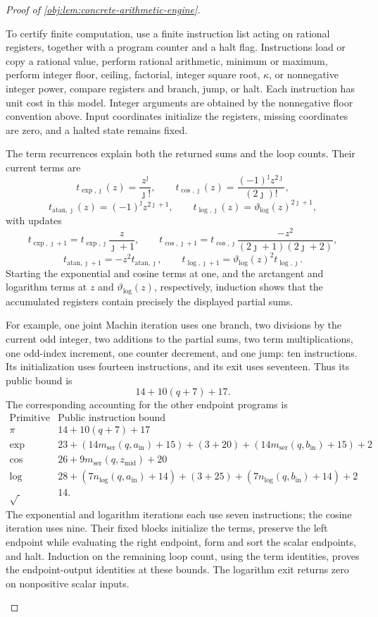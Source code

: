 \documentclass[11pt]{article}
\begin{document}
\begin{proof}[Proof of \cref{obj:lem:concrete-arithmetic-engine}]
\begin{enumerate}
To certify finite computation, use a finite instruction list acting on rational registers, together with a program counter and a halt flag. Instructions load or copy a rational value, perform rational arithmetic, minimum or maximum, perform integer floor, ceiling, factorial, integer square root, \(\kappa\), or nonnegative integer power, compare registers and branch, jump, or halt. Each instruction has unit cost in this model. Integer arguments are obtained by the nonnegative floor convention above. Input coordinates initialize the registers, missing coordinates are zero, and a halted state remains fixed.

The term recurrences explain both the returned sums and the loop counts. Their current terms are
\[
t_{\exp,\jmath}(z)=\frac{z^\jmath}{\jmath!},
\qquad
t_{\cos,\jmath}(z)=\frac{(-1)^\jmath z^{2\jmath}}{(2\jmath)!},
\]
\[
t_{\mathrm{atan},\jmath}(z)=(-1)^\jmath z^{2\jmath+1},
\qquad
t_{\log,\jmath}(z)=\vartheta_{\log}(z)^{2\jmath+1},
\]
with updates
\[
t_{\exp,\jmath+1}
 =t_{\exp,\jmath}\frac{z}{\jmath+1},
\qquad
t_{\cos,\jmath+1}
 =t_{\cos,\jmath}\frac{-z^2}{(2\jmath+1)(2\jmath+2)},
\]
\[
t_{\mathrm{atan},\jmath+1}
 =-z^2t_{\mathrm{atan},\jmath},
\qquad
t_{\log,\jmath+1}
 =\vartheta_{\log}(z)^2t_{\log,\jmath}.
\]
Starting the exponential and cosine terms at one, and the arctangent and logarithm terms at \(z\) and \(\vartheta_{\log}(z)\), respectively, induction shows that the accumulated registers contain precisely the displayed partial sums.

For example, one joint Machin iteration uses one branch, two divisions by the current odd integer, two additions to the partial sums, two term multiplications, one odd-index increment, one counter decrement, and one jump: ten instructions. Its initialization uses fourteen instructions, and its exit uses seventeen. Thus its public bound is
\[
14+10(q+7)+17.
\]
The corresponding accounting for the other endpoint programs is
\[
\begin{array}{c|l}
\text{Primitive}&\text{Public instruction bound}\\ \hline
\pi&14+10(q+7)+17\\
\exp&
23+(14m_{\mathrm{ser}}(q,a_{\mathrm{in}})+15)
 +(3+20)+(14m_{\mathrm{ser}}(q,b_{\mathrm{in}})+15)+2\\
\cos&26+9m_{\mathrm{ser}}(q,z_{\mathrm{mid}})+20\\
\log&
28+(7n_{\log}(q,a_{\mathrm{in}})+14)
 +(3+25)+(7n_{\log}(q,b_{\mathrm{in}})+14)+2\\
\sqrt{\ }&14 .
\end{array}
\]
The exponential and logarithm iterations each use seven instructions; the cosine iteration uses nine. Their fixed blocks initialize the terms, preserve the left endpoint while evaluating the right endpoint, form and sort the scalar endpoints, and halt. Induction on the remaining loop count, using the term identities, proves the endpoint-output identities at these bounds. The logarithm exit returns zero on nonpositive scalar inputs.


\end{enumerate}
\end{proof}
\end{document}
